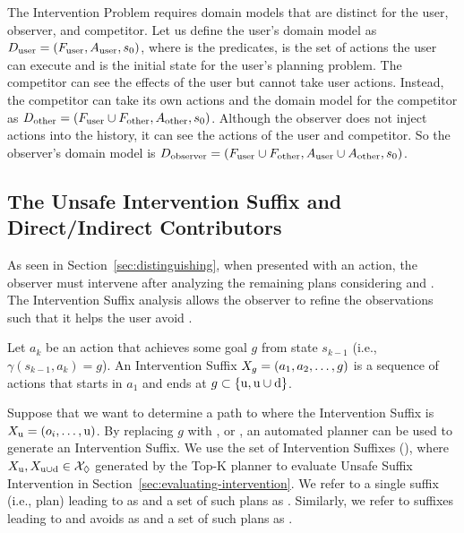 The Intervention Problem requires domain models that are distinct for the user, observer, and competitor.
Let us define the user's domain model as $D_{\textnormal{user}} = (F_{\textnormal{user}}, A_{\textnormal{user}}, s_0)$, where \factsUser is the predicates, \actionsUser is the set of actions the user can execute and \initialState is the initial state for the user's planning problem.
The competitor can see the effects of the user but cannot take user actions.  
Instead, the competitor can take its own actions and the domain model for the competitor as $D_{\textnormal{other}} = (F_{\textnormal{user}} \cup F_{\textnormal{other}}, A_{\textnormal{other}}, s_0)$.
Although the observer does not inject actions into the history, it can see the actions of the user and competitor.
So the observer's domain model is $D_{\textnormal{observer}} = (F_{\textnormal{user}} \cup F_{\textnormal{other}}, A_{\textnormal{user}} \cup A_{\textnormal{other}}, s_0)$.

\subsection{The Unsafe Intervention Suffix and Direct/Indirect Contributors}
\label{sec:suffix}
As seen in Section~\ref{sec:distinguishing}, when presented with an action, 
the observer must intervene after analyzing the remaining plans considering \undesired and \dandu. 
The Intervention Suffix analysis allows the observer to refine the observations such that it helps the user avoid \undesired. 

\begin{definition}
  \label{def:suffix}
  Let $a_k$ be an action that achieves some goal $g$ from state $s_{k-1}$ (i.e., $\gamma(s_{k-1}, a_k) = g$).
An Intervention Suffix $X_g = (a_1, a_2, \ldots, g)$ is a sequence of actions that starts in $a_1$ and ends at
 $g \subset \{\mathrm{u}, \mathrm{u}\cup\mathrm{d} \} $.
\end{definition}

Suppose that we want to determine a path to \undesired where the Intervention Suffix is $X_{\mathrm{u}} = (o_i, \ldots, \mathrm{u})$.
By replacing $g$ with \undesired, or \dandu, an automated planner can be used to generate an Intervention Suffix.
We use the set of Intervention Suffixes (\Suffixes), where $X_\mathrm{u}, X_{\mathrm{u}\cup\mathrm{d}} \in \mathcal{X}_\Diamond$ generated by the Top-K planner \cite{riabov2014} to evaluate Unsafe Suffix Intervention in Section~\ref{sec:evaluating-intervention}.
We refer to a single suffix (i.e., plan) leading to \undesired as \planUndesired and a set of such plans as \PlansUndesired.
Similarly, we refer to suffixes leading to \desired and avoids \undesired as \planDesired and a set of such plans as \PlansDesired.

